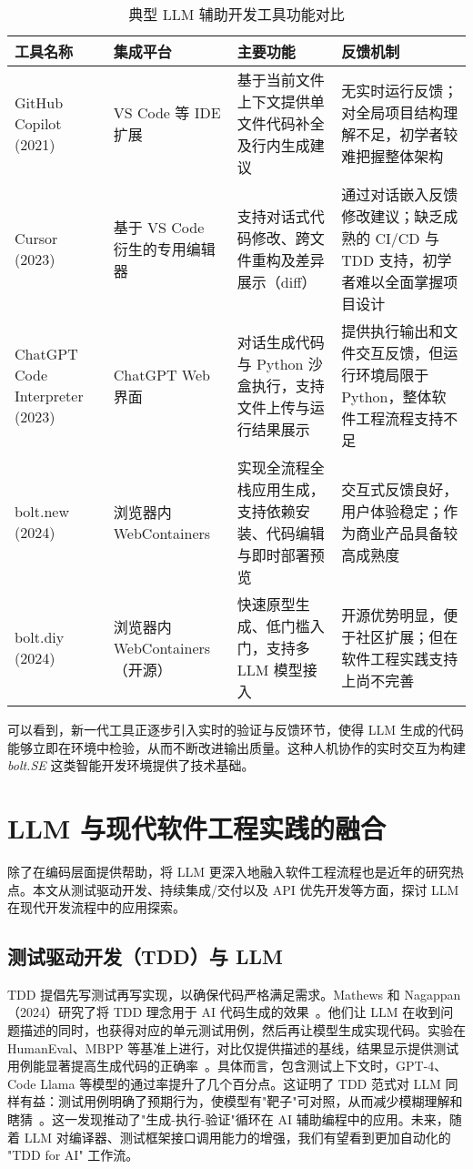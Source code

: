 \begin{table}[htbp]
\centering
\caption{典型 LLM 辅助开发工具功能对比}
\label{tab:tools}
\begin{tabular}{lllp{7cm}}
\toprule
工具名称 & 集成平台 & 主要功能 & 反馈机制 \\
\midrule
GitHub Copilot (2021) & VS Code 等 IDE 扩展 & 基于当前文件上下文提供单文件代码补全及行内生成建议 & 无实时运行反馈；对全局项目结构理解不足，初学者较难把握整体架构 \\
\addlinespace
Cursor (2023) & 基于 VS Code 衍生的专用编辑器 & 支持对话式代码修改、跨文件重构及差异展示（diff） & 通过对话嵌入反馈修改建议；缺乏成熟的 CI/CD 与 TDD 支持，初学者难以全面掌握项目设计 \\
\addlinespace
ChatGPT Code Interpreter (2023) & ChatGPT Web 界面 & 对话生成代码与 Python 沙盒执行，支持文件上传与运行结果展示 & 提供执行输出和文件交互反馈，但运行环境局限于 Python，整体软件工程流程支持不足 \\
\addlinespace
bolt.new (2024) & 浏览器内 WebContainers & 实现全流程全栈应用生成，支持依赖安装、代码编辑与即时部署预览 & 交互式反馈良好，用户体验稳定；作为商业产品具备较高成熟度 \\
\addlinespace
bolt.diy (2024) & 浏览器内 WebContainers（开源） & 快速原型生成、低门槛入门，支持多 LLM 模型接入 & 开源优势明显，便于社区扩展；但在软件工程实践支持上尚不完善 \\
\bottomrule
\end{tabular}
\end{table}



可以看到，新一代工具正逐步引入实时的验证与反馈环节，使得 LLM 生成的代码能够立即在环境中检验，从而不断改进输出质量。这种人机协作的实时交互为构建 \emph{bolt.SE} 这类智能开发环境提供了技术基础。

\section{LLM 与现代软件工程实践的融合}

除了在编码层面提供帮助，将 LLM 更深入地融入软件工程流程也是近年的研究热点。本文从测试驱动开发、持续集成/交付以及 API 优先开发等方面，探讨 LLM 在现代开发流程中的应用探索。

\subsection{测试驱动开发（TDD）与 LLM}

TDD 提倡先写测试再写实现，以确保代码严格满足需求。Mathews 和 Nagappan（2024）研究了将 TDD 理念用于 AI 代码生成的效果~\cite{Mathews2024TDD}。他们让 LLM 在收到问题描述的同时，也获得对应的单元测试用例，然后再让模型生成实现代码。实验在 HumanEval、MBPP 等基准上进行，对比仅提供描述的基线，结果显示提供测试用例能显著提高生成代码的正确率~\cite{Mathews2024TDD}。具体而言，包含测试上下文时，GPT-4、Code Llama 等模型的通过率提升了几个百分点。这证明了 TDD 范式对 LLM 同样有益：测试用例明确了预期行为，使模型有"靶子"可对照，从而减少模糊理解和瞎猜~\cite{Mathews2024TDD}。这一发现推动了"生成-执行-验证"循环在 AI 辅助编程中的应用。未来，随着 LLM 对编译器、测试框架接口调用能力的增强，我们有望看到更加自动化的 "TDD for AI" 工作流。

